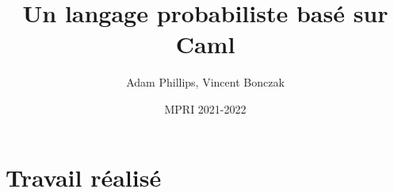 \documentclass{article}
\begin{document}
\title{Un langage probabiliste basé sur Caml}

\author{Adam Phillips, Vincent Bonczak}

\date{MPRI 2021-2022}

\maketitle

\section{Travail réalisé}
\end{document}
